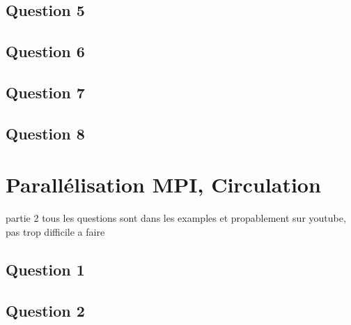 \documentclass{article}
\begin{document}
\newpage\subsection*{Question 5}
\begin{resolution}
    
\end{resolution}

\newpage\subsection*{Question 6}
\begin{resolution}
    
\end{resolution}

\newpage\subsection*{Question 7}
\begin{resolution}
    
\end{resolution}

\newpage\subsection*{Question 8}
\begin{resolution}
    
\end{resolution}


\section{Parallélisation MPI, Circulation}

partie 2
tous les questions sont dans les examples et propablement sur youtube, pas trop difficile a faire


\subsection*{Question 1}
\begin{resolution}
    
\end{resolution}

\newpage\subsection*{Question 2}
\begin{resolution}
    
\end{resolution}
\end{document}
